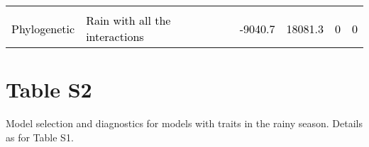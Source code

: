 \documentclass[
  12pt,
  letterpaper,
  DIV=11,
  numbers=noendperiod]{scrartcl}
\begin{document}
\begin{table}[H]
{\begin{tabular}[t]{llllll}
\cellcolor{gray!6}{\textcolor{black}{Non-phylogenetic}} & \cellcolor{gray!6}{\textcolor{black}{Rain with all the interactions}} & \cellcolor{gray!6}{\textcolor{black}{-9040.6}} & \cellcolor{gray!6}{\textcolor{black}{18081.1}} & \cellcolor{gray!6}{\textcolor{black}{0}} & \cellcolor{gray!6}{\textcolor{black}{0}}\\
\textcolor{black}{Phylogenetic} & \textcolor{black}{Rain with all the interactions} & \textcolor{black}{-9040.7} & \textcolor{black}{18081.3} & \textcolor{black}{0} & \textcolor{black}{0}\\
\bottomrule
\end{tabular}}
\end{table}

\newpage

\hypertarget{table-s2}{%
\section{Table S2}\label{table-s2}}

Model selection and diagnostics for models with traits in the rainy
season. Details as for Table S1.
\end{document}

